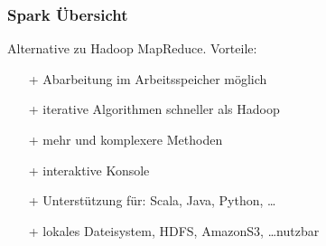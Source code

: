 \begin{frame}
    \frametitle{Spark Übersicht}
    Alternative zu Hadoop MapReduce. Vorteile:
    \begin{itemize}
        \item[+] Abarbeitung im Arbeitsspeicher möglich %
        \item[+] iterative Algorithmen schneller als Hadoop %
        \item[+] mehr und komplexere Methoden %
        \item[+] interaktive Konsole %
        \item[+] Unterstützung für: Scala, Java, Python, \ldots
        \item[+] lokales Dateisystem, HDFS, AmazonS3, \ldots nutzbar %
    \end{itemize}
    

\end{frame}
